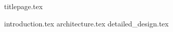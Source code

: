 \documentclass[12pt]{article}
\begin{document}
{titlepage.tex}

\tableofcontents

{introduction.tex}
{architecture.tex}
{detailed_design.tex}
\end{document}
